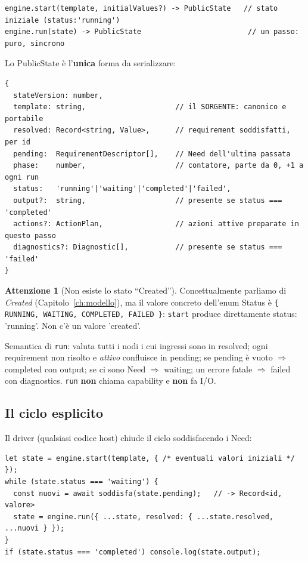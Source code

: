 \documentclass[11pt,a4paper]{book}
\let\code\lstinline
\newcommand{\ic}[1]{{\ttfamily #1}}
\theoremstyle{definition}
\newtheorem*{attenzione}{Attenzione}
\begin{document}
{{{{\begin{lstlisting}
engine.start(template, initialValues?) -> PublicState   // stato iniziale (status:'running')
engine.run(state) -> PublicState                         // un passo: puro, sincrono
\end{lstlisting}

Lo \ic{PublicState} è l'\textbf{unica} forma da serializzare:

\begin{lstlisting}
{
  stateVersion: number,
  template: string,                     // il SORGENTE: canonico e portabile
  resolved: Record<string, Value>,      // requirement soddisfatti, per id
  pending:  RequirementDescriptor[],    // Need dell'ultima passata
  phase:    number,                     // contatore, parte da 0, +1 a ogni run
  status:   'running'|'waiting'|'completed'|'failed',
  output?:  string,                     // presente se status === 'completed'
  actions?: ActionPlan,                 // azioni attive preparate in questo passo
  diagnostics?: Diagnostic[],           // presente se status === 'failed'
}
\end{lstlisting}

\begin{attenzione}[Non esiste lo stato ``Created'']
Concettualmente parliamo di \emph{Created} (Capitolo~\ref{ch:modello}), ma il valore
concreto dell'enum \ic{Status} è \verb|{ RUNNING, WAITING, COMPLETED, FAILED }|:
\code|start| produce direttamente \ic{status: 'running'}. Non c'è un valore
\ic{'created'}.
\end{attenzione}

Semantica di \code|run|: valuta tutti i nodi i cui ingressi sono in \ic{resolved};
ogni requirement non risolto e \emph{attivo} confluisce in \ic{pending}; se
\ic{pending} è vuoto $\Rightarrow$ \ic{completed} con \ic{output}; se ci sono
\ic{Need} $\Rightarrow$ \ic{waiting}; un errore fatale $\Rightarrow$ \ic{failed} con
\ic{diagnostics}. \code|run| \textbf{non} chiama capability e \textbf{non} fa I/O.

\subsection{Il ciclo esplicito}

Il driver (qualsiasi codice host) chiude il ciclo soddisfacendo i \ic{Need}:

\begin{lstlisting}
let state = engine.start(template, { /* eventuali valori iniziali */ });
while (state.status === 'waiting') {
  const nuovi = await soddisfa(state.pending);   // -> Record<id, valore>
  state = engine.run({ ...state, resolved: { ...state.resolved, ...nuovi } });
}
if (state.status === 'completed') console.log(state.output);
\end{lstlisting}

}}}}
\end{document}
